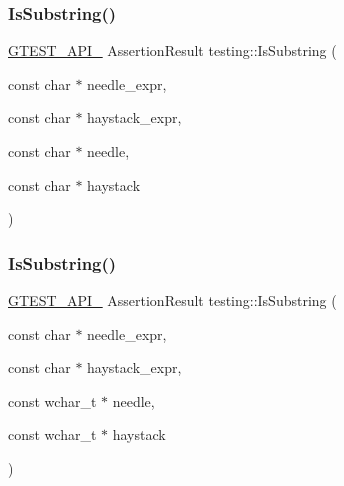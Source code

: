 \subsubsection{\texorpdfstring{Is\+Substring()}{IsSubstring()}\hspace{0.1cm}{\footnotesize\ttfamily [1/3]}}
{\footnotesize\ttfamily \hyperlink{gtest-port_8h_aa73be6f0ba4a7456180a94904ce17790}{G\+T\+E\+S\+T\+\_\+\+A\+P\+I\+\_\+} Assertion\+Result testing\+::\+Is\+Substring (\begin{DoxyParamCaption}\item[{const char $\ast$}]{needle\+\_\+expr,  }\item[{const char $\ast$}]{haystack\+\_\+expr,  }\item[{const char $\ast$}]{needle,  }\item[{const char $\ast$}]{haystack }\end{DoxyParamCaption})}

\mbox{\label{namespacetesting_a08ce65847491b27a38cbac3ac15e3035}} 
\subsubsection{\texorpdfstring{Is\+Substring()}{IsSubstring()}\hspace{0.1cm}{\footnotesize\ttfamily [2/3]}}
{\footnotesize\ttfamily \hyperlink{gtest-port_8h_aa73be6f0ba4a7456180a94904ce17790}{G\+T\+E\+S\+T\+\_\+\+A\+P\+I\+\_\+} Assertion\+Result testing\+::\+Is\+Substring (\begin{DoxyParamCaption}\item[{const char $\ast$}]{needle\+\_\+expr,  }\item[{const char $\ast$}]{haystack\+\_\+expr,  }\item[{const wchar\+\_\+t $\ast$}]{needle,  }\item[{const wchar\+\_\+t $\ast$}]{haystack }\end{DoxyParamCaption})}

\mbox{\label{namespacetesting_a32718fab95b2833ab5ffc9cfc9f5c8b0}} 
